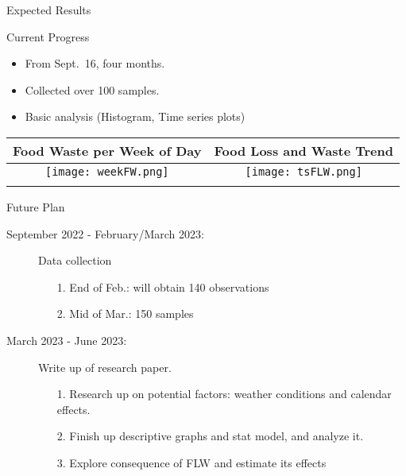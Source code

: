 \documentclass{beamer}\usepackage[]{graphicx}\usepackage[]{xcolor}
\begin{document}
\begin{frame}{Expected Results}
    \begin{block}{Current Progress}
        \begin{itemize}
            \item From Sept.~16, four months.
            \item Collected over 100 samples.
            \item Basic analysis (Histogram, Time series plots)
        \end{itemize}

        \begin{table}[]
            \begin{tabular}{cc}
                \hline
                    \small Food Waste per Week of Day & Food Loss and Waste Trend \\ \hline
                    \texttt{[image: weekFW.png]}
                    & 
                    \texttt{[image: tsFLW.png]}\\
                    &      \\
                \hline
            \end{tabular}
        \end{table}
    \end{block}
\end{frame}

\begin{frame}{Future Plan}
    \begin{description}
        \item [September 2022 - February/March 2023:] Data collection
        \begin{enumerate}
            \item[1.] End of Feb.: will obtain 140 observations
            \item[2.] Mid of Mar.: 150 samples
        \end{enumerate}
        \item [March 2023 - June 2023:] Write up of research paper.
        \begin{enumerate}
            \item[1.] Research up on potential factors: weather conditions and calendar effects.
            \item[2.] Finish up descriptive graphs and stat model, and analyze it.
            \item[3.] Explore consequence of FLW and estimate its effects
        \end{enumerate}
    \end{description}
\end{frame}
\end{document}
